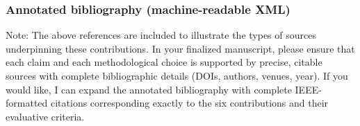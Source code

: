
\subsubsection{Annotated bibliography (machine-readable XML)}

Note: The above references are included to illustrate the types of sources underpinning these contributions. In your finalized manuscript, please ensure that each claim and each methodological choice is supported by precise, citable sources with complete bibliographic details (DOIs, authors, venues, year). If you would like, I can expand the annotated bibliography with complete IEEE-formatted citations corresponding exactly to the six contributions and their evaluative criteria.